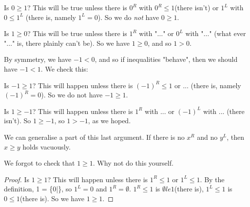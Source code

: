 \documentclass[10pt,a4paper]{book}
\begin{document}
Is $ 0 \ge 1 $? This will be true unless there is $ 0^R $ with $ 0^R \le 1 $(there isn't) or $ 1^L $ with $ 0 \le 1^L $ (there is, namely $ 1^L = 0 $). So we do \textit{not} have $ 0\ge 1 $.

Is $ 1 \ge 0 $? This will be true unless there is $ 1^R $ with "$ \dots $" or $ 0^L $ with "$ \dots $" (what ever "$ \dots $" is, there plainly can't be). So we have $ 1 \ge 0 $, and so $ 1 > 0 $.

By symmetry, we have $ -1 < 0 $, and so if inequalities "behave", then we should have $ -1 < 1 $. We check this:

Is $ -1 \ge 1 $? This will happen unless there is $ (-1)^R \le 1 $ or ... (there is, namely $ (-1)^R = 0 $). So we do not have $ -1 \ge 1 $.

Is $ 1 \ge -1 $? This will happen unless there is $ 1^R $ with ... or $ (-1)^L $ with ... (there isn't). So $ 1 \ge -1 $, so $ 1 > -1 $, as we hoped.

We can generalise a part of this last argument. If there is no $ x^R $ and no $ y^L $, then $ x \ge y $ holds vacuously.

We forgot to check that $ 1 \ge 1 $. Why not do this yourself.

\begin{proof}
	Is $ 1 \ge 1 $? This will happen unless there is $ 1^R \le 1 $ or $ 1^L \le 1 $. 
	By the definition, 1 = \{0|\}, so $ 1^L = 0 $ and $ 1^R = \emptyset $. 
	$ 1^R \le 1 $ is $ \emptyset le 1 $(there is), 
	$ 1^L \le 1 $ is $ 0 \le 1 $(there is). 
	So we have $ 1 \ge 1 $.
\end{proof}
\end{document}
